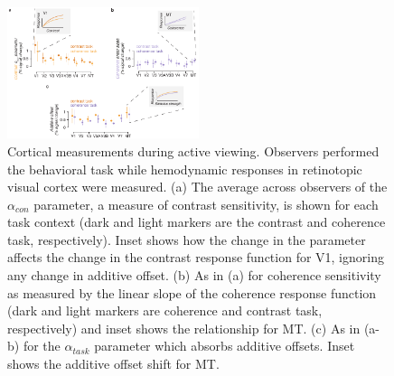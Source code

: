 \begin{figure}
\centering
\includegraphics[keepaspectratio,width=0.5\textwidth]{figs_c3/Fig3_active.pdf}
\caption[Cortical measurements during active viewing]{Cortical measurements during active viewing. Observers performed the behavioral task while hemodynamic responses in retinotopic visual cortex were measured. (a) The average across observers of the $\alpha_{con}$ parameter, a measure of contrast sensitivity, is shown for each task context (dark and light markers are the contrast and coherence task, respectively). Inset shows how the change in the parameter affects the change in the contrast response function for V1, ignoring any change in additive offset. (b) As in (a) for coherence sensitivity as measured by the linear slope of the coherence response function (dark and light markers are coherence and contrast task, respectively) and inset shows the relationship for MT. (c) As in (a-b) for the $\alpha_{task}$ parameter which absorbs additive offsets. Inset shows the additive offset shift for MT.}
\label{fig:c3f3}
\end{figure}


